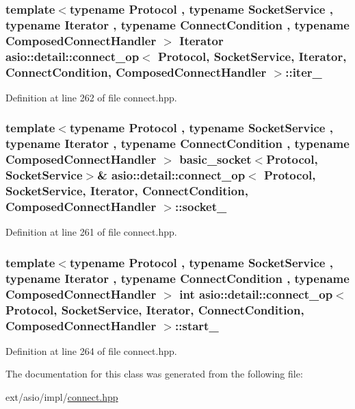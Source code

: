 \subsubsection[{iter\+\_\+}]{\setlength{\rightskip}{0pt plus 5cm}template$<$typename Protocol , typename Socket\+Service , typename Iterator , typename Connect\+Condition , typename Composed\+Connect\+Handler $>$ Iterator {\bf asio\+::detail\+::connect\+\_\+op}$<$ Protocol, Socket\+Service, Iterator, Connect\+Condition, Composed\+Connect\+Handler $>$\+::iter\+\_\+}\label{classasio_1_1detail_1_1connect__op_a4a8d375fb61d65920b8e380fac9b2d1c}


Definition at line 262 of file connect.\+hpp.

\hypertarget{classasio_1_1detail_1_1connect__op_a38289f9267dfa7a99f664446e8c12d4a}{}
\subsubsection[{socket\+\_\+}]{\setlength{\rightskip}{0pt plus 5cm}template$<$typename Protocol , typename Socket\+Service , typename Iterator , typename Connect\+Condition , typename Composed\+Connect\+Handler $>$ {\bf basic\+\_\+socket}$<$Protocol, Socket\+Service$>$\& {\bf asio\+::detail\+::connect\+\_\+op}$<$ Protocol, Socket\+Service, Iterator, Connect\+Condition, Composed\+Connect\+Handler $>$\+::socket\+\_\+}\label{classasio_1_1detail_1_1connect__op_a38289f9267dfa7a99f664446e8c12d4a}


Definition at line 261 of file connect.\+hpp.

\hypertarget{classasio_1_1detail_1_1connect__op_ae6621575bc6e65a13db6d377201d7bac}{}
\subsubsection[{start\+\_\+}]{\setlength{\rightskip}{0pt plus 5cm}template$<$typename Protocol , typename Socket\+Service , typename Iterator , typename Connect\+Condition , typename Composed\+Connect\+Handler $>$ int {\bf asio\+::detail\+::connect\+\_\+op}$<$ Protocol, Socket\+Service, Iterator, Connect\+Condition, Composed\+Connect\+Handler $>$\+::start\+\_\+}\label{classasio_1_1detail_1_1connect__op_ae6621575bc6e65a13db6d377201d7bac}


Definition at line 264 of file connect.\+hpp.



The documentation for this class was generated from the following file\+:\begin{DoxyCompactItemize}
\item 
ext/asio/impl/\hyperlink{impl_2connect_8hpp}{connect.\+hpp}\end{DoxyCompactItemize}

